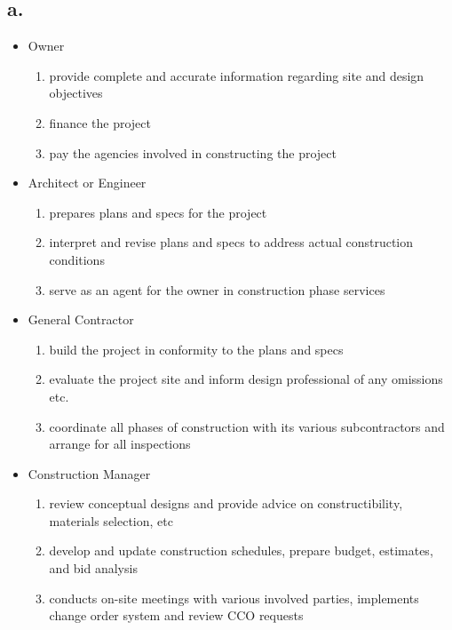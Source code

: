 \documentclass[12pt]{article}
\renewcommand{\=}[1]{\stackrel{#1}{=}} %
\theoremstyle{definition}
\theoremstyle{remark}
\begin{document}
\subsection{a.}
\begin{itemize}
	\item Owner
	\begin{enumerate}
		\item provide complete and accurate information regarding site and design objectives
		\item finance the project 
		\item pay the agencies involved in constructing the project
	\end{enumerate}
	\item Architect or Engineer
	\begin{enumerate}
		\item prepares plans and specs for the project
		\item interpret and revise plans and specs to address actual construction conditions
		\item serve as an agent for the owner in construction phase services
	\end{enumerate}
	\item General Contractor
	\begin{enumerate}
		\item build the project in conformity to the plans and specs
		\item evaluate the project site and inform design professional of any omissions etc.
		\item coordinate all phases of construction with its various subcontractors and arrange for all inspections
	\end{enumerate}
	\item Construction Manager
	\begin{enumerate}
		\item review conceptual designs and provide advice on constructibility, materials selection, etc
		\item develop and update construction schedules, prepare budget, estimates, and bid analysis
		\item conducts on-site meetings with various involved parties, implements change order system and review CCO requests
	\end{enumerate}
\end{itemize}
\end{document}
